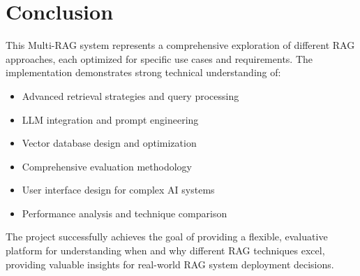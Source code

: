 \documentclass[12pt,a4paper]{article}
\begin{document}

\section{Conclusion}

This Multi-RAG system represents a comprehensive exploration of different RAG approaches, each optimized for specific use cases and requirements. The implementation demonstrates strong technical understanding of:

\begin{itemize}
    \item Advanced retrieval strategies and query processing
    \item LLM integration and prompt engineering
    \item Vector database design and optimization
    \item Comprehensive evaluation methodology
    \item User interface design for complex AI systems
    \item Performance analysis and technique comparison
\end{itemize}

The project successfully achieves the goal of providing a flexible, evaluative platform for understanding when and why different RAG techniques excel, providing valuable insights for real-world RAG system deployment decisions.
\end{document}

